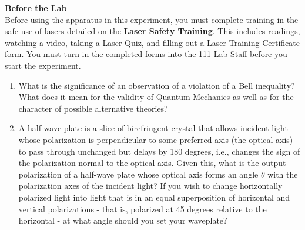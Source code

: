 \documentclass{../signatures}
\begin{document}
\maketitle

\names

\textbf{Before the Lab}
\\[12pt]
Before using the apparatus in this experiment, you must complete training in the safe use of lasers detailed on the \href{http://experimentationlab.berkeley.edu/lasersafety}{\textbf{Laser Safety Training}}. This includes readings, watching a video, taking a Laser Quiz, and filling out a Laser Training Certificate form. You must turn in the completed forms into the 111 Lab Staff before you start the experiment.
\\[32pt]
\prelab

\begin{enumerate}

    \item What is the significance of an observation of a violation of a Bell inequality? What does it mean for the validity of Quantum Mechanics as well as for the character of possible alternative theories?
    
    \item A half-wave plate is a slice of birefringent crystal that allows incident light whose polarization is perpendicular to some preferred axis (the optical axis) to pass through unchanged but delays by 180 degrees, i.e., changes the sign of the polarization normal to the optical axis. Given this, what is the output polarization of a half-wave plate whose optical axis forms an angle $\theta$ with the polarization axes of the incident light? If you wish to change horizontally polarized light into light that is in an equal superposition of horizontal and vertical polarizations - that is, polarized at 45 degrees relative to the horizontal - at what angle should you set your waveplate?


\end{enumerate}
\end{document}
